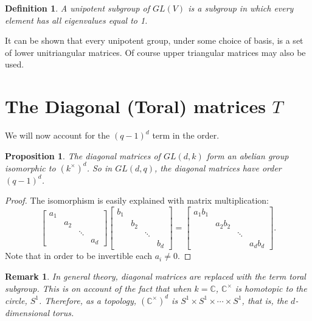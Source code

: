 \documentclass[12pt]{article}
\newtheorem{prop}[thm]{Proposition}
\newtheorem{defn}[thm]{Definition}
\newtheorem{remark}[thm]{Remark}
\begin{document}
\begin{defn}
A unipotent subgroup of $GL(V)$ is a subgroup in which every element has
all eigenvalues equal to 1.
\end{defn}

It can be shown that every unipotent group, under some choice of basis, is a set
of lower unitriangular matrices.  Of course upper triangular matrices may also be used.

\section{The Diagonal (Toral) matrices $T$}

We will now account for the $(q-1)^d$ term in the order.

\begin{prop}
The diagonal matrices of $GL(d,k)$ form an abelian group isomorphic to $(k^\times)^d$.  So in $GL(d,q)$, the diagonal matrices have order $(q-1)^d$.
\end{prop}
\begin{proof}
The isomorphism is easily explained with matrix multiplication:
\[
\begin{bmatrix} 
a_1 & \\
 & a_2 \\
 & & \ddots\\
 & & & a_d
\end{bmatrix}
\begin{bmatrix} 
b_1 & \\
 & b_2 \\
 & & \ddots\\
 & & & b_d
\end{bmatrix}
=
\begin{bmatrix} 
a_1 b_1 & \\
 & a_2 b_2 \\
 & & \ddots\\
 & & & a_d b_d
\end{bmatrix}
.\]
Note that in order to be invertible each $a_i\neq 0$.
\end{proof}

\begin{remark}
In general theory, diagonal matrices are replaced with the term \emph{toral} subgroup.  This is on account of the fact that when $k=\mathbb{C}$, $\mathbb{C}^\times$ is homotopic to the circle, $S^1$.  Therefore, as a 
topology, $(\mathbb{C}^\times)^d$ is $S^1 \times S^1\times \cdots \times S^1$,
that is, the $d$-dimensional torus.
\end{remark}
\end{document}
